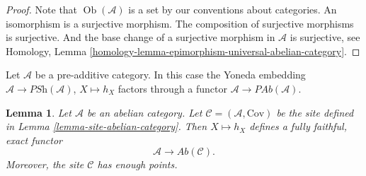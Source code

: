 \documentclass{stacks-project}
\theoremstyle{plain}
\newtheorem{lemma}[subsection]{Lemma}
\theoremstyle{definition}
\theoremstyle{remark}
\numberwithin{equation}{subsection}
\def\Ob{\mathop{\mathrm{Ob}}\nolimits}
\begin{document}
\begin{proof}
Note that $\Ob(\mathcal{A})$ is a set by our conventions
about categories. An isomorphism is a surjective morphism.
The composition of surjective morphisms is surjective.
And the base change of a surjective morphism in $\mathcal{A}$
is surjective, see
Homology, Lemma \ref{homology-lemma-epimorphism-universal-abelian-category}.
\end{proof}

\noindent
Let $\mathcal{A}$ be a pre-additive category. In this case the
Yoneda embedding $\mathcal{A} \to \textit{PSh}(\mathcal{A})$, $X \mapsto h_X$
factors through a functor $\mathcal{A} \to \textit{PAb}(\mathcal{A})$.

\begin{lemma}
\label{lemma-embedding}
Let $\mathcal{A}$ be an abelian category.
Let $\mathcal{C} = (\mathcal{A}, \text{Cov})$ be the
site defined in
Lemma \ref{lemma-site-abelian-category}.
Then $X \mapsto h_X$ defines a fully faithful, exact functor
$$
\mathcal{A} \longrightarrow \textit{Ab}(\mathcal{C}).
$$
Moreover, the site $\mathcal{C}$ has enough points.
\end{lemma}
\end{document}
